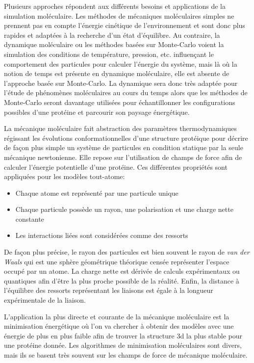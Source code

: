 Plusieurs approches répondent aux différents besoins et applications de la simulation moléculaire. 
Les méthodes de mécaniques moléculaires simples ne prennent pas en compte l'énergie cinétique de l'environnement et sont donc plus rapides et adaptées à la recherche d'un état d'équilibre. Au contraire, la dynamique moléculaire ou les méthodes basées sur Monte-Carlo voient la simulation des conditions de température, pression, etc. influençant le comportement des particules pour calculer l'énergie du système, mais là où la notion de temps est présente en dynamique moléculaire, elle est absente de l'approche basée sur Monte-Carlo. La dynamique sera donc très adaptée pour l'étude de phénomènes moléculaires au cours du temps alors que les méthodes de Monte-Carlo seront davantage utilisées pour échantillonner les configurations possibles d'une protéine et parcourir son paysage énergétique.



La mécanique moléculaire fait abstraction des paramètres thermodynamiques régissant les évolutions conformationnelles d'une structure protéique pour décrire de façon plus simple un système de particules en condition statique par la seule mécanique newtonienne. Elle repose sur l'utilisation de champs de force afin de calculer l'énergie potentielle d'une protéine. Ces différentes propriétés sont appliquées pour les modèles tout-atome:

\begin{itemize}
  \item Chaque atome est représenté par une particule unique
  \item Chaque particule possède un rayon, une polarisation et une charge nette constante
  \item Les interactions liées sont considérées comme des ressorts 
\end{itemize}

De façon plus précise, le rayon des particules est bien souvent le rayon de \textit{van der Waals} qui est une sphère géométrique théorique censée représenter l'espace occupé par un atome. La charge nette est dérivée de calculs expérimentaux ou quantiques afin d'être la plus proche possible de la réalité. Enfin, la distance à l'équilibre des ressorts représentant les liaisons est égale à la longueur expérimentale de la liaison.

L'application la plus directe et courante de la mécanique moléculaire est la minimisation énergétique où l'on va chercher à obtenir des modèles avec une énergie de plus en plus faible afin de trouver la structure 3d la plus stable pour une protéine donnée. Les algorithmes de minimisation moléculaires sont divers, mais ils se basent très souvent sur les champs de force de mécanique moléculaire.

